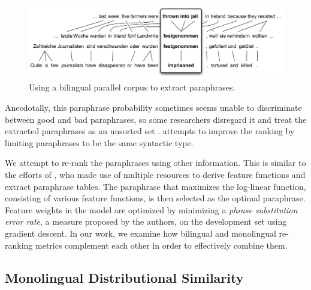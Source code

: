 \documentclass[11pt]{article}
\begin{document}
\begin{figure}
\begin{center}
\includegraphics[width=\linewidth]{pivot-2}
\end{center}
\caption{\small Using a bilingual parallel corpus to extract paraphrases.}
\label{paraphrase-illustration}
\end{figure}

Anecdotally, this paraphrase probability sometimes seems unable to discriminate between good and bad paraphrases, so some researchers disregard it and treat the extracted paraphrases as an unsorted set \cite{Snover2010}.   attempts to improve the ranking by limiting paraphrases to be the same syntactic type.  

We attempt to re-rank the paraphrases using other information. This is similar to the efforts of , who made use of multiple resources %
to derive feature functions and extract paraphrase tables. The paraphrase that maximizes the log-linear function, consisting of various feature functions, is then selected as the optimal paraphrase. Feature weights in the model are optimized by minimizing a {\it phrase substitution error rate}, a measure proposed by the authors, on the development set using gradient descent. In our work, we examine how bilingual and monolingual re-ranking metrics complement each other in order to effectively combine them.

\subsection{Monolingual Distributional Similarity}

\label{sect:mds}
\end{document}
